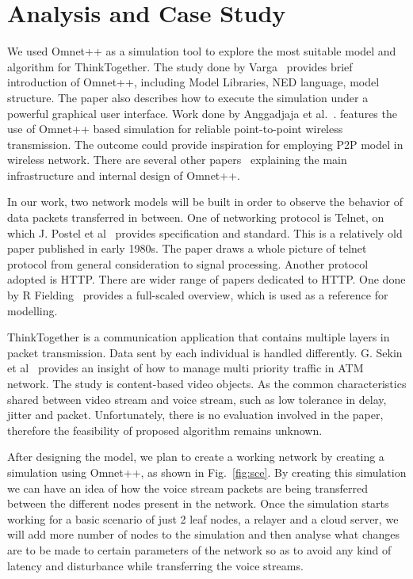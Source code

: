 \section{Analysis and Case Study}
We used Omnet++ as a simulation tool to explore the most 
suitable model and algorithm for ThinkTogether. The study done by 
Varga~\cite{A_OMNET_ESM01} 
provides brief introduction of Omnet++, including Model Libraries, NED 
language, 
model structure. The paper also describes how to execute the simulation under a 
powerful graphical user interface. Work done by Anggadjaja et 
al.~\cite{EI_OMNET_ACT10}. features the 
use of Omnet++ based 
simulation for reliable point-to-point wireless transmission. The outcome could 
provide inspiration for employing P2P model in wireless network. There 
are several other papers~\cite{MM_OMNET_OMN08,XX_OMNET_ICQ12} explaining the 
main infrastructure and 
internal 
design of Omnet++. 

In our work, two network models will be built in order to observe the behavior 
of data packets transferred in between. One of networking protocol is Telnet, on 
which J. Postel et al~\cite{JJ_TEL83} provides specification and 
standard. This is a relatively old paper published in early 1980s. The 
paper draws a whole picture of telnet protocol from general consideration to 
signal processing. Another protocol adopted is HTTP. There are wider 
range of papers dedicated to HTTP. One done by R Fielding~\cite{BJJH_HTTP1999} 
provides a full-scaled overview, which is used as a reference for modelling. 


ThinkTogether is a communication application that contains multiple layers in 
packet transmission. Data sent by each individual is handled differently. G. 
Sekin et al~\cite{GF_COM00} provides an insight of how to manage multi 
priority traffic in ATM network. The study is content-based video 
objects. As the common characteristics shared between video stream and voice 
stream, such as low tolerance in delay, jitter and packet. Unfortunately, there 
is no evaluation involved in the paper, therefore the feasibility of proposed 
algorithm remains unknown. 

After designing the model, we plan to create a working 
network by creating a simulation using Omnet++, as shown in Fig.~\ref{fig:sce}. 
By creating this simulation we can have an idea of how the voice stream packets 
are being transferred between the different nodes present in the network. Once 
the simulation starts working for a basic scenario of just 2 leaf nodes, a 
relayer and a cloud server, we will add more number of nodes to the simulation 
and then analyse what changes are to be made to certain parameters of the 
network so as to avoid any kind of latency and disturbance while transferring 
the voice streams. 

